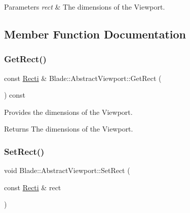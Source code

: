 \begin{DoxyParams}{Parameters}
{\em rect} & The dimensions of the Viewport. \\
\hline
\end{DoxyParams}


\subsection{Member Function Documentation}
\mbox{\label{class_blade_1_1_abstract_viewport_abd3c922bb2552224fccea3f940160f05}} 
\subsubsection{\texorpdfstring{Get\+Rect()}{GetRect()}}
{\footnotesize\ttfamily const \hyperlink{namespace_blade_ac765e9c5c8205009994e4243d9d6f81c}{Recti} \& Blade\+::\+Abstract\+Viewport\+::\+Get\+Rect (\begin{DoxyParamCaption}{ }\end{DoxyParamCaption}) const\hspace{0.3cm}{\ttfamily [noexcept]}}



Provides the dimensions of the Viewport. 

\begin{DoxyReturn}{Returns}
The dimensions of the Viewport. 
\end{DoxyReturn}
\mbox{\label{class_blade_1_1_abstract_viewport_af229a400e575300684e8f84794ba299d}} 
\subsubsection{\texorpdfstring{Set\+Rect()}{SetRect()}}
{\footnotesize\ttfamily void Blade\+::\+Abstract\+Viewport\+::\+Set\+Rect (\begin{DoxyParamCaption}\item[{const \hyperlink{namespace_blade_ac765e9c5c8205009994e4243d9d6f81c}{Recti} \&}]{rect }\end{DoxyParamCaption})\hspace{0.3cm}{\ttfamily [noexcept]}}



